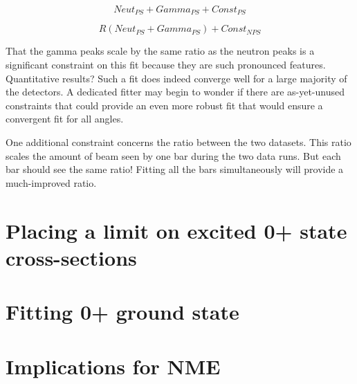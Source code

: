 \begin{equation}
Neut_{PS} + Gamma_{PS} + Const_{PS}
\end{equation}

\begin{equation}
R(Neut_{PS} + Gamma_{PS}) + Const_{NPS}
\end{equation}

That the gamma peaks scale by the same ratio as the neutron peaks is a significant constraint on this fit because they are such pronounced features.  Quantitative results?  Such a fit does indeed converge well for a large majority of the detectors.  A dedicated fitter may begin to wonder if there are as-yet-unused constraints that could provide an even more robust fit that would ensure a convergent fit for all angles.

One additional constraint concerns the ratio between the two datasets.  This ratio scales the amount of beam seen by one bar during the two data runs.  But each bar should see the same ratio!  Fitting all the bars simultaneously will provide a much-improved ratio.




\section{Placing a limit on excited 0+ state cross-sections}

\section{Fitting 0+ ground state}

\section{Implications for \zvbb NME}

%
% 
% 
